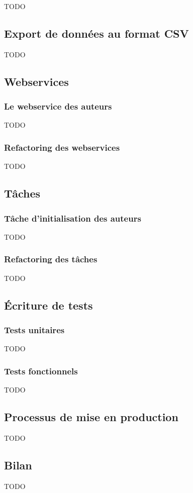 TODO





\subsection{Export de données au format CSV}

TODO

\subsection{Webservices}

\subsubsection{Le webservice des auteurs}

TODO

\subsubsection{Refactoring des webservices}

TODO

\subsection{Tâches}

\subsubsection{Tâche d'initialisation des auteurs}

TODO

\subsubsection{Refactoring des tâches}

TODO

\subsection{Écriture de tests}

\subsubsection{Tests unitaires}

TODO

\subsubsection{Tests fonctionnels}

TODO

\subsection{Processus de mise en production}

TODO

\subsection{Bilan}

TODO
